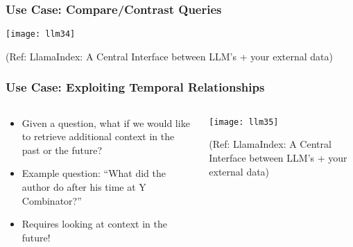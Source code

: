 \begin{frame}[fragile]\frametitle{Use Case: Compare/Contrast Queries}


\begin{center}
\texttt{[image: llm34]}

{\tiny (Ref: LlamaIndex: A Central Interface between LLM’s + your external data)}
\end{center}
\end{frame}


\begin{frame}[fragile]\frametitle{Use Case: Exploiting Temporal Relationships}

\begin{columns}
    \begin{column}[T]{0.4\linewidth}
		\begin{itemize}
		\item Given a question, what if we would like to retrieve additional context in the past or the future?
		\item Example question: “What did the author do after his time at Y Combinator?” 
		\item Requires looking at context in the future! 
		\end{itemize}	
    \end{column}
    \begin{column}[T]{0.6\linewidth}
		\begin{center}
		\texttt{[image: llm35]}

		{\tiny (Ref: LlamaIndex: A Central Interface between LLM’s + your external data)}
		\end{center}
    \end{column}
  \end{columns}
\end{frame}


